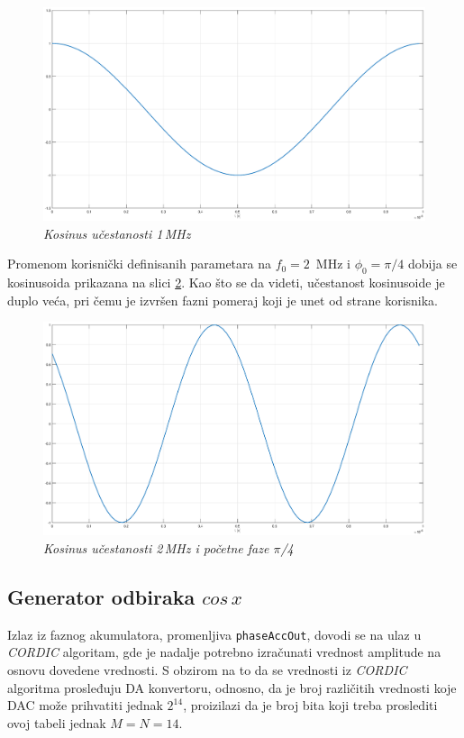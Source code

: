 \documentclass[conference]{IEEEtran}
\begin{document}
\begin{figure}[h]
	\centering
	\includegraphics[scale=0.15]{./slike/kos1.eps}
	\caption{\textsl{Kosinus učestanosti 1\,MHz}}
	\label{slika:kos1}
\end{figure}

Promenom korisnički definisanih parametara na $f_0 = 2$\, MHz i $\phi_0 = \pi/4$ dobija se kosinusoida prikazana na slici \ref{slika:kos2}. Kao što se da videti, učestanost kosinusoide je duplo veća, pri čemu je izvršen fazni pomeraj koji je unet od strane korisnika.

\begin{figure}[h]
	\centering
	\includegraphics[scale=0.15]{./slike/kos2.eps}
	\caption{\textsl{Kosinus učestanosti 2\,MHz i početne faze $\pi$/4}}
	\label{slika:kos2}
\end{figure}
\pagebreak

\subsection{Generator odbiraka $cos\,x$}
Izlaz iz faznog akumulatora, promenljiva \texttt{phaseAccOut}, dovodi se na ulaz u \textit{CORDIC} algoritam, gde je nadalje potrebno izračunati vrednost amplitude na osnovu dovedene vrednosti. S obzirom na to da se vrednosti iz \textit{CORDIC} algoritma prosleđuju DA konvertoru, odnosno, da je broj različitih vrednosti koje DAC može prihvatiti jednak $2^{14}$, proizilazi da je broj bita koji treba proslediti ovoj tabeli jednak $M=N=14$.
\end{document}
